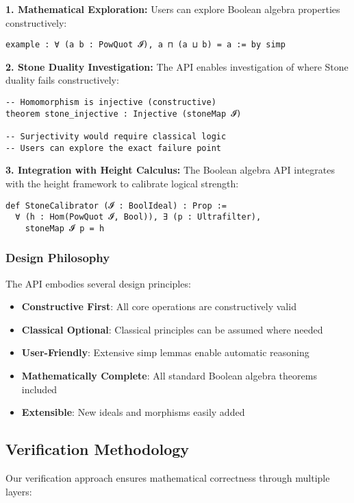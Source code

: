 \documentclass[11pt]{article}
\theoremstyle{plain}
\theoremstyle{definition}
\begin{document}
\textbf{1. Mathematical Exploration:}
Users can explore Boolean algebra properties constructively:
\begin{verbatim}
example : ∀ (a b : PowQuot 𝓘), a ⊓ (a ⊔ b) = a := by simp
\end{verbatim}

\textbf{2. Stone Duality Investigation:}
The API enables investigation of where Stone duality fails constructively:
\begin{verbatim}
-- Homomorphism is injective (constructive)
theorem stone_injective : Injective (stoneMap 𝓘)

-- Surjectivity would require classical logic
-- Users can explore the exact failure point
\end{verbatim}

\textbf{3. Integration with Height Calculus:}
The Boolean algebra API integrates with the height framework to calibrate logical strength:
\begin{verbatim}
def StoneCalibrator (𝓘 : BoolIdeal) : Prop :=
  ∀ (h : Hom(PowQuot 𝓘, Bool)), ∃ (p : Ultrafilter), 
    stoneMap 𝓘 p = h
\end{verbatim}

\subsubsection{Design Philosophy}

The API embodies several design principles:
\begin{itemize}
\item \textbf{Constructive First}: All core operations are constructively valid
\item \textbf{Classical Optional}: Classical principles can be assumed where needed
\item \textbf{User-Friendly}: Extensive simp lemmas enable automatic reasoning
\item \textbf{Mathematically Complete}: All standard Boolean algebra theorems included
\item \textbf{Extensible}: New ideals and morphisms easily added
\end{itemize}

\subsection{Verification Methodology}

Our verification approach ensures mathematical correctness through multiple layers:
\end{document}
